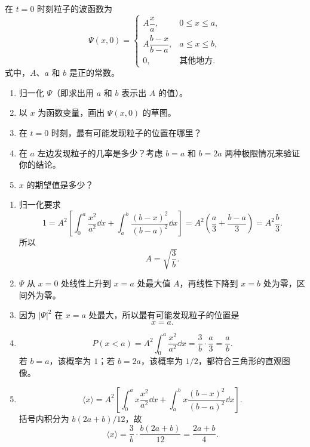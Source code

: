 \begin{question}
在 $t=0$ 时刻粒子的波函数为
\[
\Psi(x,0)=
\begin{cases}
A\dfrac{x}{a}, & 0\le x\le a,\\[0.6em]
A\dfrac{b-x}{b-a}, & a\le x\le b,\\[0.6em]
0, & \text{其他地方}.
\end{cases}
\]
式中，$A$、$a$ 和 $b$ 是正的常数。
\begin{enumerate}
\item 归一化 $\Psi$（即求出用 $a$ 和 $b$ 表示出 $A$ 的值）。
\item 以 $x$ 为函数变量，画出 $\Psi(x,0)$ 的草图。
\item 在 $t=0$ 时刻，最有可能发现粒子的位置在哪里？
\item 在 $a$ 左边发现粒子的几率是多少？考虑 $b=a$ 和 $b=2a$ 两种极限情况来验证你的结论。
\item $x$ 的期望值是多少？
\end{enumerate}
\end{question}
\begin{solution}
\begin{enumerate}
\item 归一化要求
\[
1=A^2\left[\int_0^a\frac{x^2}{a^2}\dd x+
\int_a^b\frac{(b-x)^2}{(b-a)^2}\dd x\right]
=A^2\left(\frac a3+\frac{b-a}{3}\right)
=A^2\frac b3.
\]
所以
\[
A=\sqrt{\frac{3}{b}}.
\]
\item $\Psi$ 从 $x=0$ 处线性上升到 $x=a$ 处最大值 $A$，再线性下降到 $x=b$ 处为零，区间外为零。
\item 因为 $|\Psi|^2$ 在 $x=a$ 处最大，所以最有可能发现粒子的位置是
\[
x=a.
\]
\item
\[
P(x<a)=A^2\int_0^a\frac{x^2}{a^2}\dd x
=\frac{3}{b}\cdot\frac a3=\frac ab.
\]
若 $b=a$，该概率为 $1$；若 $b=2a$，该概率为 $1/2$，都符合三角形的直观图像。
\item
\[
\langle x\rangle=A^2\left[\int_0^a x\frac{x^2}{a^2}\dd x+
\int_a^b x\frac{(b-x)^2}{(b-a)^2}\dd x\right].
\]
括号内积分为 $b(2a+b)/12$，故
\[
\langle x\rangle=\frac{3}{b}\cdot\frac{b(2a+b)}{12}=\frac{2a+b}{4}.
\]
\end{enumerate}
\end{solution}

